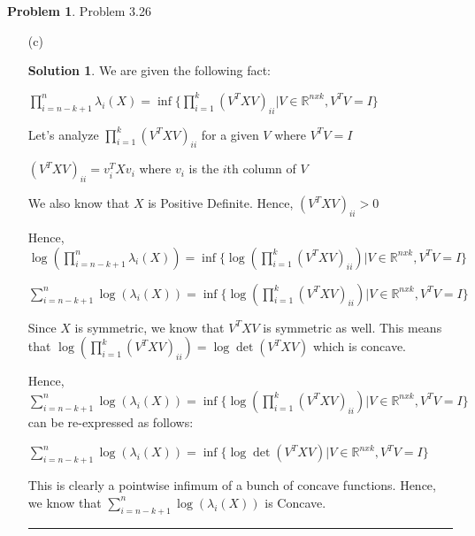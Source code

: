 \documentclass{article}
\theoremstyle{definition}
\newtheorem{problem}{Problem}
\def\fline{\rule{0.75\linewidth}{0.5pt}}
\newcommand{\finishline}{\begin{center}\fline\end{center}}
\newtheorem*{solution*}{Solution}
\newenvironment{solution}{\begin{solution*}}{{\finishline} \end{solution*}}
\begin{document}
\begin{problem} Problem 3.26
    \begin{itemize}
        \item[(c)] 
        \begin{solution}
            We are given the following fact: \newline 

            $\prod_{i=n - k + 1}^{n} \lambda_i(X) = \inf \{ \prod_{i=1}^{k} (V^T X V)_{ii} | V \in \mathbb{R}^{n x k}, V^TV = I \}$

            Let's analyze $\prod_{i=1}^{k} (V^T X V)_{ii}$ for a given $V$ where $V^TV = I$ \newline 

            $(V^T X V)_{ii} = v_i^T X v_i$ where $v_i$ is the $i$th column of $V$ \newline 

            We also know that $X$ is Positive Definite. Hence, $(V^T X V)_{ii} > 0$ \newline 

            Hence, 
            $\log(\prod_{i=n - k + 1}^{n} \lambda_i(X)) = \inf \{ \log(\prod_{i=1}^{k} (V^T X V)_{ii}) | V \in \mathbb{R}^{n x k}, V^TV = I \}$ \newline 

            $\sum_{i=n - k + 1}^{n} \log(\lambda_i(X)) = \inf \{ \log(\prod_{i=1}^{k} (V^T X V)_{ii}) | V \in \mathbb{R}^{n x k}, V^TV = I \}$

            Since $X$ is symmetric, we know that $V^TXV$ is symmetric as well. This means that $\log(\prod_{i=1}^{k} (V^T X V)_{ii}) = \log \det(V^T X V)$ which is concave. 

            Hence, $\sum_{i=n - k + 1}^{n} \log(\lambda_i(X)) = \inf \{ \log(\prod_{i=1}^{k} (V^T X V)_{ii}) | V \in \mathbb{R}^{n x k}, V^TV = I \}$ can be re-expressed as follows: \newline 

            $\sum_{i=n - k + 1}^{n} \log(\lambda_i(X)) = \inf \{ \log \det (V^T X V) | V \in \mathbb{R}^{n x k}, V^TV = I \}$

            This is clearly a pointwise infimum of a bunch of concave functions. Hence, we know that $\sum_{i=n - k + 1}^{n} \log(\lambda_i(X))$ is Concave. 




            
        \end{solution}
    \end{itemize}
\end{problem}
\end{document}
